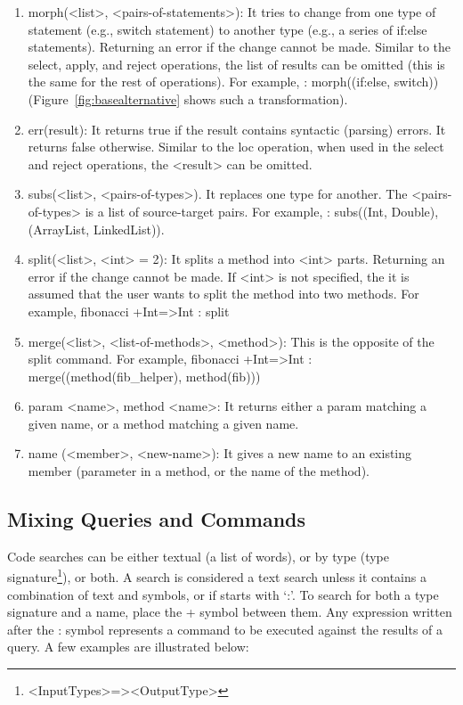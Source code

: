 \begin{enumerate}
	\item morph(<list>, <pairs-of-statements>): It tries to change from one type of statement 
	(e.g., switch statement) to another type (e.g., a series of if:else statements). Returning an 
	error if the change cannot be made. Similar to the select, apply, and reject operations, the 
	list of results can be omitted (this is the same for the rest of operations). For example, : 
	morph((if:else, switch)) (Figure~\ref{fig:basealternative} shows such a transformation).  
	
	\item err(result): It returns true if the result contains syntactic (parsing) errors. 
	It returns false otherwise. Similar to the loc operation, when used in the select and reject 
	operations, the <result> can be omitted.
	
	\item subs(<list>, <pairs-of-types>). It replaces one type for another. The 
	<pairs-of-types> is a list of source-target pairs. For example, : subs((Int, Double),
	(ArrayList, LinkedList)).
	
	\item split(<list>, <int> = 2): It splits a method into <int> parts. Returning an 
	error if the change cannot be made. If <int> is not specified, the it is assumed that the user 
	wants to split the method into two methods. For example, fibonacci +Int=>Int : split

   \item merge(<list>, <list-of-methods>, <method>): This is the opposite of the split command. 
	For example, fibonacci +Int=>Int : merge((method(fib\_helper), method(fib)))
	
	\item param <name>, method <name>: It returns either a param matching a given name, 
	or a method matching a given name.
	
	\item name (<member>, <new-name>): It gives a new name to an existing member (parameter in 
	a method, or the name of the method).
	
\end{enumerate}

\subsection{Mixing Queries and Commands}
\label{sec:queriescommands}

Code searches can be either textual (a list of words), or by type (type signature\footnote{<InputTypes>=><OutputType>}), or both. A search is considered a text search unless it contains a combination of text and symbols, or if starts with `:'. To search for both a type signature and a name, place the + symbol between them. Any expression written after the : symbol represents a command to be executed against the results of a query. A few examples are illustrated below:

